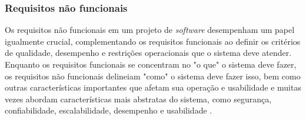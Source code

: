        
\subsubsection{Requisitos não funcionais}

Os requisitos não funcionais em um projeto de \textit{software} desempenham um papel igualmente crucial, complementando os requisitos funcionais ao definir os critérios de qualidade, desempenho e restrições operacionais que o sistema deve atender. Enquanto os requisitos funcionais se concentram no "o que" o sistema deve fazer, os requisitos não funcionais delineiam "como" o sistema deve fazer isso, bem como outras características importantes que afetam sua operação e usabilidade e muitas vezes abordam características mais abstratas do sistema, como segurança, confiabilidade, escalabilidade, desempenho e usabilidade \cite{softwareengreq}. 
            
